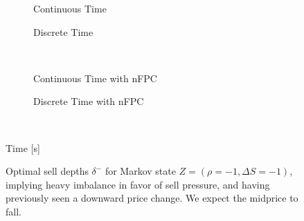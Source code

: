 \begin{figure}%
\centering%
\begin{subfigure}[b]{.4\linewidth}%
  \setlength\figureheight{\linewidth}%
  \setlength\figurewidth{\linewidth}%
  \caption{Continuous Time}%
\end{subfigure}%
\hspace{1.5cm}%
\begin{subfigure}[b]{.4\linewidth}%
  \setlength\figureheight{\linewidth}%
  \setlength\figurewidth{\linewidth}%
  \caption{Discrete Time}%
\end{subfigure}\\%
\vspace{1cm}%
\begin{subfigure}[b]{.4\linewidth}%
  \setlength\figureheight{\linewidth}%
  \setlength\figurewidth{\linewidth}%
  \caption{Continuous Time with nFPC}%
\end{subfigure}%
\hspace{1.5cm}%
\begin{subfigure}[b]{.4\linewidth}%
  \setlength\figureheight{\linewidth}%
  \setlength\figurewidth{\linewidth}%
  \caption{Discrete Time with nFPC}%
\end{subfigure}\\%
%
\leavevmode{}\hspace{0pt plus 1filll}\null%

Time [s]

\vspace{1cm}%
\begin{subfigure}{\linewidth}%
  \centering%
\end{subfigure}%
  \caption[Optimal sell LO depths for sell pressure imbalance]{Optimal sell depths $\delta^{-}$ for Markov state $Z=(\rho = -1, \Delta S = -1)$, implying heavy imbalance in favor of sell pressure, and having previously seen a downward price change. We expect the midprice to fall.}\label{fig:comp_dm_z1}%
\end{figure}
